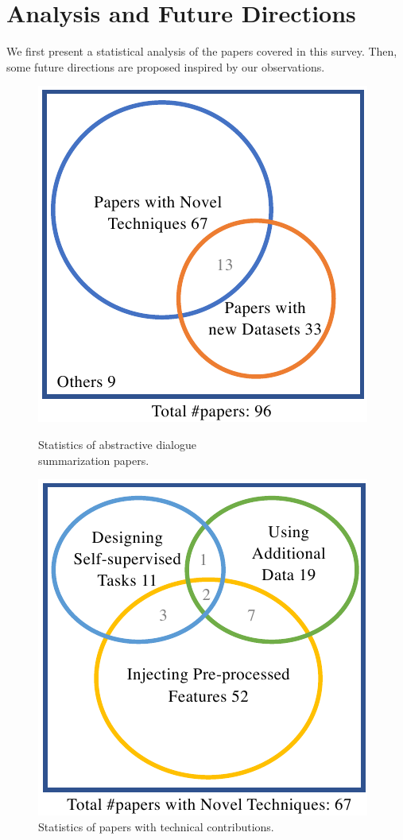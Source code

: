 \section{Analysis and Future Directions}
We first present a statistical analysis of the papers 
covered in this survey. Then, some future directions are proposed inspired by
our observations.
\begin{figure}[htbp]
	\centering
	\begin{minipage}[t]{0.45\linewidth}
		\centering
		\includegraphics[scale=0.55]{fig/distribution1.pdf}
		\caption{Statistics of abstractive dialogue \\summarization papers.}
		\label{fig:papers}
	\end{minipage}
	\begin{minipage}[t]{0.45\linewidth}
		\centering
		\includegraphics[scale=0.55]{fig/distribution2.pdf}
		\caption{Statistics of papers with technical contributions.}
		\label{fig:technical}
	\end{minipage}
\end{figure}
